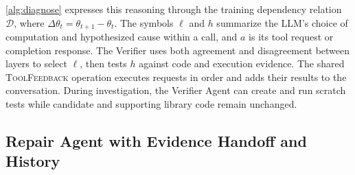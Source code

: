 {\cref{alg:diagnose} expresses this reasoning through the training dependency relation $\mathcal D$, where $\Delta\theta_t=\theta_{t+1}-\theta_t$. The symbols $\ell$ and $h$ summarize the LLM's choice of computation and hypothesized cause within a call, and $a$ is its tool request or completion response. The Verifier uses both agreement and disagreement between layers to select $\ell$, then tests $h$ against code and execution evidence. The shared \textsc{ToolFeedback} operation executes requests in order and adds their results to the conversation. During investigation, the Verifier Agent can create and run scratch tests while candidate and supporting library code remain unchanged.\par}

\subsection{Repair Agent with Evidence Handoff and History}
\label{sec:repair-agent}
